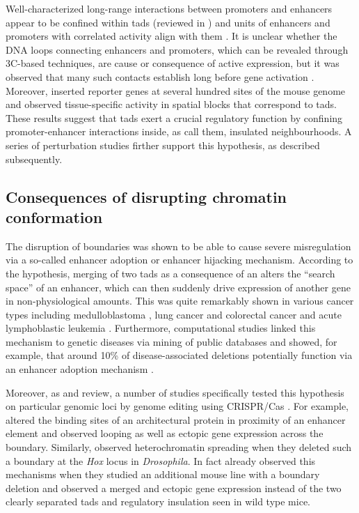 Well-characterized long-range interactions between promoters and enhancers
appear to be confined within \acp{tad} (reviewed in \cite{Smallwood2013}) and
units of enhancers and promoters with correlated activity align with them
\citep{Shen2012}. It is unclear whether the DNA loops connecting enhancers
and promoters, which can be revealed through 3C-based techniques, are cause
or consequence of active expression, but it was
observed that many such contacts establish long before gene activation
\citep{Ghavi-Helm2014}. Moreover, \cite{Symmons2014} inserted reporter genes at
several hundred sites of the mouse genome and observed tissue-specific activity
in spatial blocks that correspond to \acp{tad}. These results suggest that
\acp{tad} exert a crucial regulatory function by confining promoter-enhancer
interactions inside, as \cite{Ji2016} call them, insulated neighbourhoods. A
series of perturbation studies firther support this hypothesis, as described
subsequently.





\subsection{Consequences of disrupting chromatin conformation}
\label{sec:disrupting_tads}

The disruption of \tad boundaries was shown to be able to cause severe
misregulation via a so-called enhancer adoption \citep{Lettice2011} or enhancer
hijacking \citep{Northcott2014} mechanism. According to the hypothesis, merging
of two \acp{tad} as a consequence of an \sv alters the ``search space'' of an
enhancer, which can then suddenly drive expression of another gene in
non-physiological amounts. This was quite remarkably shown in various cancer
types including medulloblastoma \citep{Northcott2014}, lung cancer and
colorectal cancer \citep{Weischenfeldt2016} and acute lymphoblastic leukemia
\citep{Hnisz2016}. Furthermore, computational studies linked this mechanism to
genetic diseases via mining of public databases and showed, for example, that
around 10\% of disease-associated deletions potentially function via an enhancer
adoption mechanism \citep{Ibn-Salem2014,Li2016,Zepeda-Mendoza2017}.

Moreover, as \cite{Lupianez2016} and \cite{Krijger2016} review, a number of studies
specifically tested this hypothesis on particular genomic loci by genome
editing using CRISPR/Cas \citep{Doudna2014}. For example, \cite{Guo2015} altered
the binding sites of an architectural protein in proximity of an enhancer element
and observed looping as well as ectopic gene expression across the boundary.
Similarly, \cite{Narendra2015} observed heterochromatin spreading when they
deleted such a boundary at the \textit{Hox} locus in \textit{Drosophila}.
In fact already \cite{Nora2012} observed this mechanisms when they studied an
additional mouse line with a \tad boundary deletion and observed a merged \tad
and ectopic gene expression instead of the two clearly separated \acp{tad} and
regulatory insulation seen in wild type mice.

